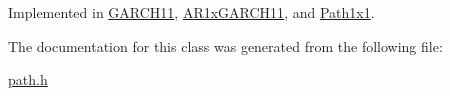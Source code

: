 Implemented in \hyperlink{classGARCH11_a202ee361532058114cfc036c27bef601}{G\+A\+R\+C\+H11}, \hyperlink{classAR1xGARCH11_ac97f026cefd0e8bca4bbc31100f945d7}{A\+R1x\+G\+A\+R\+C\+H11}, and \hyperlink{classPath1x1_abd21c19e5283035ebe2ca01711134e4c}{Path1x1}.



The documentation for this class was generated from the following file\+:\begin{DoxyCompactItemize}
\item 
\hyperlink{path_8h}{path.\+h}\end{DoxyCompactItemize}
